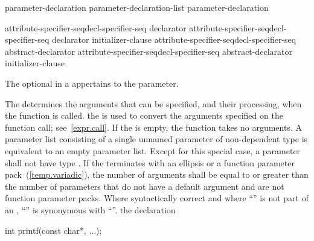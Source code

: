\begin{bnf}
\br
    parameter-declaration\br
    parameter-declaration-list \terminal{,} parameter-declaration
\end{bnf}

\begin{bnf}
\br
    attribute-specifier-seq\opt decl-specifier-seq declarator\br
    attribute-specifier-seq\opt decl-specifier-seq declarator \terminal{=} initializer-clause\br
    attribute-specifier-seq\opt decl-specifier-seq abstract-declarator\opt\br
    attribute-specifier-seq\opt decl-specifier-seq abstract-declarator\opt \terminal{=} initializer-clause
\end{bnf}

The optional  in a 
appertains to the parameter.

\pnum
{}%
The
determines the arguments that can be specified, and their processing, when the function is called.
\enternote
{}%
the
is used to convert the arguments specified on the function call;
see~\ref{expr.call}.
\exitnote
{}%
If the
is empty, the function takes no arguments.
A parameter list consisting of a single unnamed parameter of
non-dependent type  is equivalent to an empty parameter
list.
%
Except for this special case, a parameter shall not have type 
.
If the
%
%
%
%
%
terminates with an ellipsis or a function parameter
pack~(\ref{temp.variadic}), the number of arguments shall be equal
to or greater than the number of parameters that do not have a default
argument and are not function parameter packs.
Where syntactically correct and where ``'' is not
part of an ,
``''
is synonymous with
``''.
\enterexample
{}%
%
the declaration

\begin{codeblock}
int printf(const char*, ...);
\end{codeblock}


